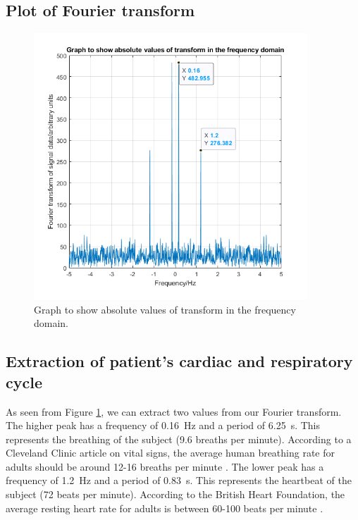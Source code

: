 \documentclass[11pt]{article}
\numberwithin{equation}{section}
\begin{document}
\subsection{Plot of Fourier transform}

\begin{figure}[H]
    \centering
    \includegraphics[height = 10cm]{./img/q302a.png}
    \caption{Graph to show absolute values of transform in the frequency domain.}
    \label{fig:q302a}
\end{figure}
\subsection{Extraction of patient's cardiac and respiratory cycle}
As seen from Figure \ref{fig:q302a}, we can extract two values from our Fourier transform. The higher peak has a frequency of \SI{0.16}{\hertz} and a period of \SI{6.25}{\second}. This represents the breathing of the subject (9.6 breaths per minute). According to a Cleveland Clinic article on vital signs, the average human breathing rate for adults should be around 12-16 breaths per minute \cite{q3.3.1}. The lower peak has a frequency of \SI{1.2}{\hertz} and a period of \SI{0.83}{\second}. This represents the heartbeat of the subject (72 beats per minute). According to the British Heart Foundation, the average resting heart rate for adults is between 60-100 beats per minute \cite{q3.3.2}.
\end{document}
